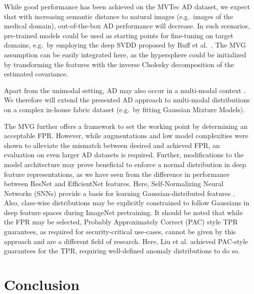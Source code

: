 \documentclass[conference, a4paper]{./template/IEEEtran}
\begin{document}
While good performance has been achieved on the MVTec AD dataset, we expect that with increasing semantic distance to natural images (e.g.\ images of the medical domain), out-of-the-box AD performance will decrease.
In such scenarios, pre-trained models could be used as starting points for fine-tuning on target domains, e.g.\ by employing the deep SVDD proposed by Ruff et al.\ \cite{Ruff2018}.
The MVG assumption can be easily integrated here, as the hypersphere could be initialized by transforming the features with the inverse Cholesky decomposition of the estimated covariance. 

Apart from the unimodal setting, AD may also occur in a multi-modal context \cite{Ahmed2019}.
We therefore will extend the presented AD approach to multi-modal distributions on a complex in-house fabric dataset (e.g.\ by fitting Gaussian Mixture Models).

The MVG further offers a framework to set the working point by determining an acceptable FPR.
However, while augmentations and low model complexities were shown to alleviate the mismatch between desired and achieved FPR, an evaluation on even larger AD datasets is required.
Further, modifications to the model architecture may prove beneficial to enforce a normal distribution in deep feature representations, as we have seen from the difference in performance between ResNet and EfficientNet features.
Here, Self-Normalizing Neural Networks (SNNs) provide a basis for learning Gaussian-distributed features \cite{Klambauer2017}.
Also, class-wise distributions may be explicitly constrained to follow Gaussians in deep feature spaces during ImageNet pretraining.
It should be noted that while the FPR may be selected, Probably Approximately Correct (PAC) style TPR guarantees, as required for security-critical use-cases, cannot be given by this approach and are a different field of research.
Here, Liu et al. \cite{Liu2018} achieved PAC-style guarantees for the TPR, requiring well-defined anomaly distributions to do so.







\section{Conclusion}
\end{document}
